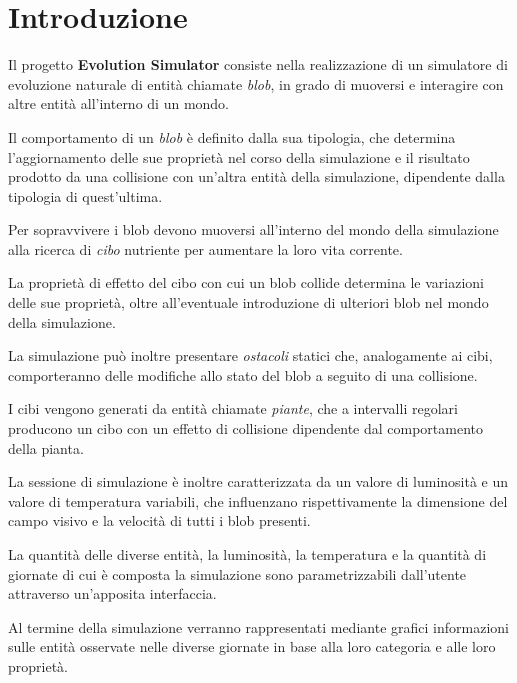 \section*{Introduzione}

Il progetto \textbf{Evolution Simulator} consiste nella realizzazione di un simulatore di evoluzione naturale di entità chiamate \textit{blob}, in grado di muoversi e interagire con altre entità all'interno di un mondo.

Il comportamento di un \textit{blob} è definito dalla sua tipologia, che determina l'aggiornamento delle sue proprietà nel corso della simulazione e il risultato prodotto da una collisione con un'altra entità della simulazione, dipendente dalla tipologia di quest'ultima.

Per sopravvivere i blob devono muoversi all'interno del mondo della simulazione alla ricerca di \textit{cibo} nutriente per aumentare la loro vita corrente.

La proprietà di effetto del cibo con cui un blob collide determina le variazioni delle sue proprietà, oltre all'eventuale introduzione di ulteriori blob nel mondo della simulazione. 

La simulazione può inoltre presentare \textit{ostacoli} statici che, analogamente ai cibi, comporteranno delle modifiche allo stato del blob a seguito di una collisione.

I cibi vengono generati da entità chiamate \textit{piante}, che a intervalli regolari producono un cibo con un effetto di collisione dipendente dal comportamento della pianta.

La sessione di simulazione è inoltre caratterizzata da un valore di luminosità e un valore di temperatura variabili, che influenzano rispettivamente la dimensione del campo visivo e la velocità di tutti i blob presenti.

La quantità delle diverse entità, la luminosità, la temperatura e la quantità di giornate di cui è composta la simulazione sono parametrizzabili dall'utente attraverso un'apposita interfaccia.

Al termine della simulazione verranno rappresentati mediante grafici informazioni sulle entità osservate nelle diverse giornate in base alla loro categoria e alle loro proprietà.